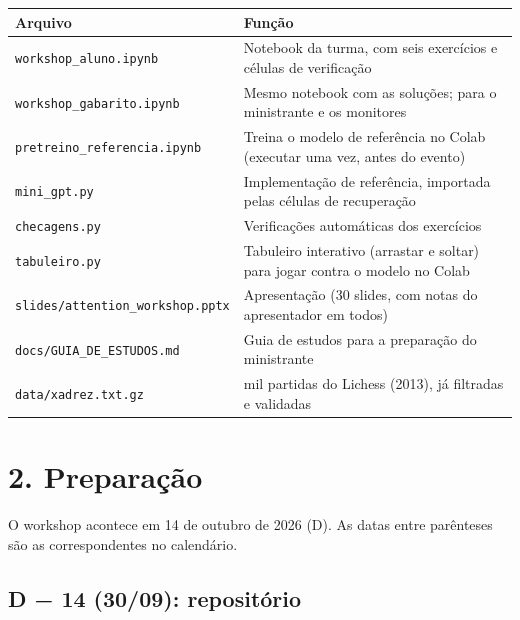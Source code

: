 \documentclass[
  11pt,
]{article}
\begin{document}
\begin{longtable}[]{@{}
  >{\raggedright\arraybackslash}p{}
  >{\raggedright\arraybackslash}p{}@{}}
\toprule\noalign{}
\begin{minipage}[b]{\linewidth}\raggedright
Arquivo
\end{minipage} & \begin{minipage}[b]{\linewidth}\raggedright
Função
\end{minipage} \\
\midrule\noalign{}
\endhead
\bottomrule\noalign{}
\endlastfoot
\texttt{workshop\_aluno.ipynb} & Notebook da turma, com seis exercícios
e células de verificação \\
\texttt{workshop\_gabarito.ipynb} & Mesmo notebook com as soluções; para
o ministrante e os monitores \\
\texttt{pretreino\_referencia.ipynb} & Treina o modelo de referência no
Colab (executar uma vez, antes do evento) \\
\texttt{mini\_gpt.py} & Implementação de referência, importada pelas
células de recuperação \\
\texttt{checagens.py} & Verificações automáticas dos exercícios \\
\texttt{tabuleiro.py} & Tabuleiro interativo (arrastar e soltar) para
jogar contra o modelo no Colab \\
\texttt{slides/attention\_workshop.pptx} & Apresentação (30 slides, com
notas do apresentador em todos) \\
\texttt{docs/GUIA\_DE\_ESTUDOS.md} & Guia de estudos para a preparação
do ministrante \\
\texttt{data/xadrez.txt.gz} & 60 mil partidas do Lichess (2013), já
filtradas e validadas \\
\end{longtable}

\section{2. Preparação}\label{preparauxe7uxe3o}

O workshop acontece em 14 de outubro de 2026 (D). As datas entre
parênteses são as correspondentes no calendário.

\subsection{D − 14 (30/09): repositório}\label{d-14-3009-reposituxf3rio}
\end{document}
